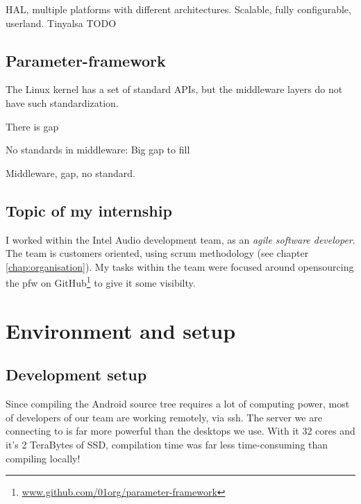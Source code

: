 HAL, multiple platforms with different architectures.
Scalable, fully configurable, userland.
Tinyalsa
TODO

\subsection{Parameter-framework}
\label{sec:parameter-framework}
The Linux \gls{kernel} has a set of standard APIs, but the middleware layers do not have such standardization.

There is gap

No standards in middleware:
Big gap to fill


Middleware, gap, no standard.

\subsection{Topic of my internship}

I worked within the Intel Audio development team, as an \emph{agile
software developer}. The team is customers oriented, using \gls{scrum}
methodology (see chapter \ref{chap:organisation}). My tasks
within the team were focused around opensourcing the \gls{pfw} on
GitHub\footnote{\url{www.github.com/01org/parameter-framework}} to give it some
visibilty.


\section{Environment and setup}

\subsection{Development setup}
Since compiling the Android source tree requires a lot of computing power,
most of developers of our team are working remotely, via ssh.
The server we are connecting to is far more powerful than the desktops we use.
With it 32 cores and it's 2 TeraBytes of SSD, compilation time was far less time-consuming
than compiling locally!

